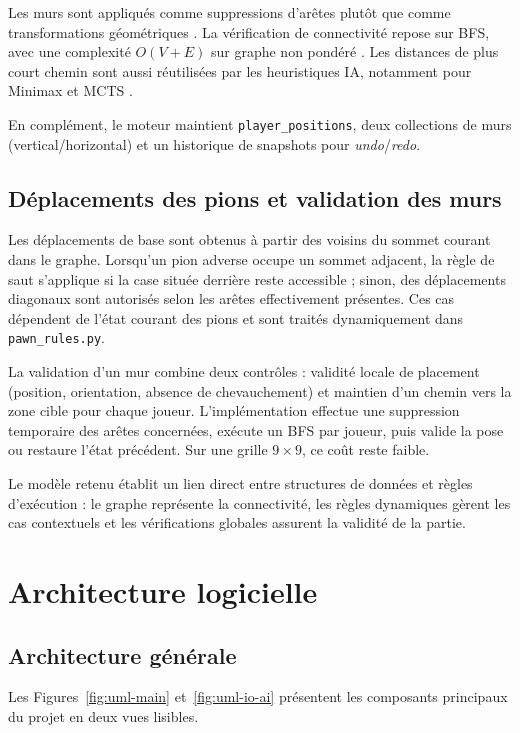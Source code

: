 \documentclass[a4paper]{article}
\begin{document}
Les murs sont appliqués comme suppressions d'arêtes plutôt que comme
transformations géométriques \cite{glendenning2005quoridor}. La vérification de
connectivité repose sur BFS, avec une complexité $O(V+E)$ sur graphe non
pondéré \cite{cormen2009introduction}. Les distances de plus court chemin sont
aussi réutilisées par les heuristiques IA, notamment pour Minimax et MCTS
\cite{ison2018mctsquoridor,mertens2006}.

En complément, le moteur maintient \texttt{player\_positions}, deux collections
de murs (vertical/horizontal) et un historique de snapshots pour
\emph{undo}/\emph{redo}.

\subsection{Déplacements des pions et validation des murs}

Les déplacements de base sont obtenus à partir des voisins du sommet courant
dans le graphe. Lorsqu'un pion adverse occupe un sommet adjacent, la règle de
saut s'applique si la case située derrière reste accessible ; sinon, des
déplacements diagonaux sont autorisés selon les arêtes effectivement présentes.
Ces cas dépendent de l'état courant des pions et sont traités dynamiquement
dans \texttt{pawn\_rules.py}.

La validation d'un mur combine deux contrôles : validité locale de placement
(position, orientation, absence de chevauchement) et maintien d'un chemin vers
la zone cible pour chaque joueur. L'implémentation effectue une suppression
temporaire des arêtes concernées, exécute un BFS par joueur, puis valide la
pose ou restaure l'état précédent. Sur une grille $9\times 9$, ce coût reste
faible.

Le modèle retenu établit un lien direct entre structures de données et règles
d'exécution : le graphe représente la connectivité, les règles dynamiques
gèrent les cas contextuels et les vérifications globales assurent la validité
de la partie.

\section{Architecture logicielle}

\subsection{Architecture générale}

Les Figures~\ref{fig:uml-main} et~\ref{fig:uml-io-ai} présentent les composants
principaux du projet en deux vues lisibles.
\end{document}
